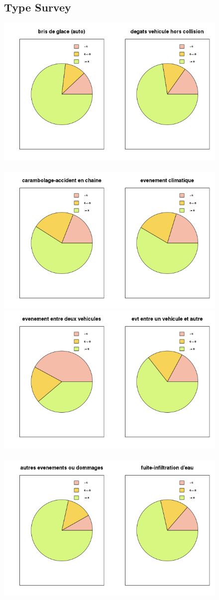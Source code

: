 \documentclass[a4paper, 11pt]{article}
\begin{document}
      

        \begin{figure}[!ht]
        \subsection{Type Survey}
        	\centering
                \includegraphics[width = 8.5 cm]{Remi/Level_of_satisfaction_according_to_TYPE_OF_SURVEY2.png}~
                \includegraphics[width = 8.5 cm]{Remi/Level_of_satisfaction_according_to_TYPE_OF_SURVEY4.png}
                \includegraphics[width = 8.5 cm]{Remi/Level_of_satisfaction_according_to_TYPE_OF_SURVEY6.png}~
                \includegraphics[width = 8.5 cm]{Remi/Level_of_satisfaction_according_to_TYPE_OF_SURVEY8.png}

\end{figure}
\end{document}

